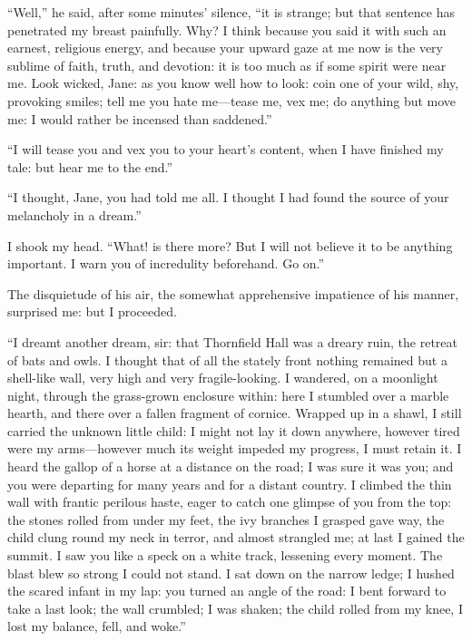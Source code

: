 \enquote{Well,} he said, after some minutes' silence, \enquote{it is
strange; but that sentence has penetrated my breast painfully.  Why?  I
think because you said it with such an earnest, religious energy, and
because your upward gaze at me now is the very sublime of faith, truth,
and devotion: it is too much as if some spirit were near me.  Look
wicked, Jane: as you know well how to look: coin one of your wild, shy,
provoking smiles; tell me you hate me---tease me, vex me; do anything
but move me: I would rather be incensed than saddened.}

\enquote{I will tease you and vex you to your heart's content, when I
have finished my tale: but hear me to the end.}

\enquote{I thought, Jane, you had told me all.  I thought I had found
the source of your melancholy in a dream.}

I shook my head.  \enquote{What! is there more?  But I will not believe
it to be anything important.  I warn you of incredulity beforehand.  Go
on.}

The disquietude of his air, the somewhat apprehensive impatience of his
manner, surprised me: but I proceeded.

\enquote{I dreamt another dream, sir: that Thornfield Hall was a dreary
ruin, the retreat of bats and owls.  I thought that of all the stately
front nothing remained but a shell-like wall, very high and very
fragile-looking.  I wandered, on a moonlight night, through the
grass-grown enclosure within: here I stumbled over a marble hearth, and
there over a fallen fragment of cornice.  Wrapped up in a shawl, I still
carried the unknown little child: I might not lay it down anywhere,
however tired were my arms---however much its weight impeded my
progress, I must retain it.  I heard the gallop of a horse at a distance
on the road; I was sure it was you; and you were departing for many
years and for a distant country.  I climbed the thin wall with frantic
perilous haste, eager to catch one glimpse of you from the top: the
stones rolled from under my feet, the ivy branches I grasped gave way,
the child clung round my neck in terror, and almost strangled me; at
last I gained the summit.  I saw you like a speck on a white track,
lessening every moment.  The blast blew so strong I could not stand.  I
sat down on the narrow ledge; I hushed the scared infant in my lap: you
turned an angle of the road: I bent forward to take a last look; the
wall crumbled; I was shaken; the child rolled from my knee, I lost my
balance, fell, and woke.}

